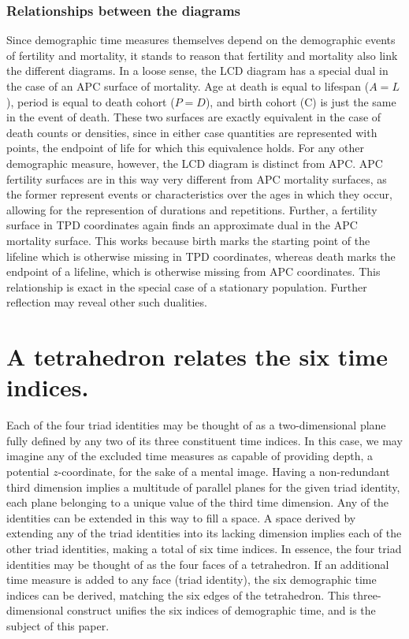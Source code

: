 \documentclass[12pt,oneside,a4paper]{article} %
\begin{document}
\subsubsection{Relationships between the diagrams}
Since demographic time measures themselves depend on the demographic events of
fertility and mortality, it stands to reason that fertility and mortality also
link the different diagrams. In a loose sense, the LCD diagram has a
special dual in the case of an APC surface of mortality. Age at death is equal
to lifespan ($A=L$), period is equal to death cohort ($P=D$), and birth cohort
(C) is just the same in the event of death. These two surfaces are exactly
equivalent in the case of death counts or densities, since in either case
quantities are represented with points, the endpoint of life for which this
equivalence holds. For any other demographic measure, however, the LCD diagram
is distinct from APC. APC fertility surfaces are in this way very different from
APC mortality surfaces, as the former represent events or characteristics over
the ages in which they occur, allowing for the represention of
durations and repetitions.
Further, a fertility surface in TPD coordinates
again finds an approximate dual in the APC mortality surface. This works
because birth marks the starting point of the lifeline which is otherwise
missing in TPD coordinates, whereas death marks the endpoint of a lifeline,
which is otherwise missing from APC coordinates. This relationship is exact in
the special case of a stationary population. Further reflection may
reveal other such dualities.

\FloatBarrier
\section{A tetrahedron relates the six time indices.}
Each of the four triad identities may be thought of as a
two-dimensional plane fully defined by any two of its three constituent time
indices.
In this case, we may imagine any of the excluded time measures as capable of
providing depth, a potential $z$-coordinate, for the sake of a mental image.
Having a non-redundant third dimension implies a multitude of parallel planes
for the given triad identity, each plane belonging to a unique value of the
third time dimension. Any of the identities can be extended in this way to fill a space. A space derived by
extending any of the triad identities into its lacking dimension implies each of
the other triad identities, making a total of six time indices. In essence, the
four triad identities may be thought of as the four faces of a
tetrahedron. If an additional time measure is added to any face (triad
identity), the six demographic time indices can be derived, matching the six edges of the tetrahedron. This three-dimensional construct unifies the six indices of demographic time, and is the subject of this paper.
\end{document}
